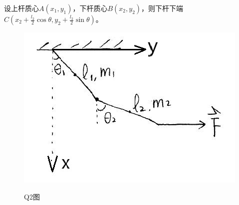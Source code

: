 \documentclass[10pt,a4paper]{article}
\begin{document}
\noindent 设上杆质心$A(x_1,y_1)$，下杆质心$B(x_2,y_2)$，则下杆下端$C(x_2+\frac{l_2}{2}\cos\theta,y_2+\frac{l_2}{2}\sin\theta)$。
\begin{figure}[h]
\centering
\includegraphics[scale=.5]{FigureofHomework_4_Q2.jpg}\\
\caption{Q2图}\label{FigureofHomework_4_Q2}
\end{figure}
\end{document}
